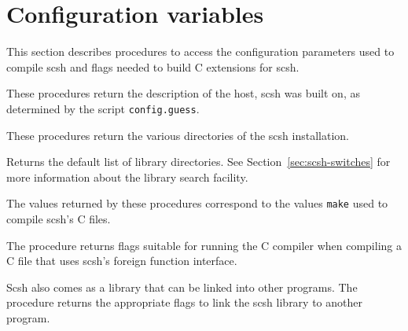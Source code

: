 \section{Configuration variables}
\label{sec:configure}

This section describes procedures to access the configuration
parameters used to compile scsh and flags needed to build C extensions
for scsh.

\begin{desc}
  These procedures return the description of the host, scsh was built
  on, as determined by the script \texttt{config.guess}.
\end{desc}
%
\begin{desc}
  These procedures return the various directories of
  the scsh installation.
\end{desc}
%
\begin{desc}
  Returns the default list of library directories. See
  Section~\ref{sec:scsh-switches} for more information about the
  library search facility.
\end{desc}
%
\begin{desc}
  The values returned by these procedures correspond to the values
\texttt{make} used to compile scsh's C files.
\end{desc}
%
\begin{desc}
  The procedure  returns flags suitable for
  running the C compiler when compiling a C file that uses scsh's
  foreign function interface.
\end{desc}

\begin{desc}
  Scsh also comes as a library that can be linked into other programs.
  The procedure  returns the appropriate flags to
  link the scsh library to another program.
\end{desc}


